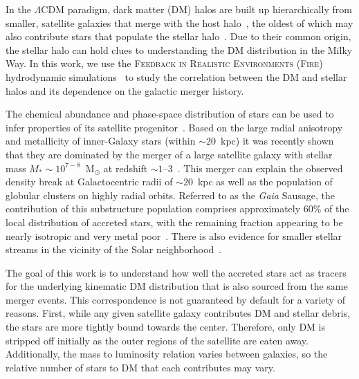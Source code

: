 \documentclass[twocolumn,preprintnumbers]{aastex6}
\begin{document}
In the $\Lambda$CDM paradigm, dark matter (DM) halos are built up hierarchically from smaller, satellite galaxies that merge with the host halo~\citep{1978MNRAS.183..341W,Diemand:2008in,Springel:2008cc,2011ApJ...740..102K}, the oldest of which may also contribute stars that populate the stellar halo~\citep{Johnston:1995vd, Johnston:1996sb, Helmi:1999ks, Bullock:2000qf, Bullock:2005pi, Purcell:2007tr, DeLucia:2008gk}. Due to their common origin, the stellar halo can hold clues to understanding the DM distribution in the Milky Way.  In this work, we use the \textsc{Feedback in Realistic Environments (Fire)} hydrodynamic simulations~\citep{2014MNRAS.445..581H, 2017arXiv170206148H} to study the correlation between the DM and stellar halos and its dependence on the galactic merger history.

The chemical abundance and phase-space distribution of stars can be used to infer properties of its satellite progenitor~\citep{Helmi:2002iu, 2005ApJ...635..931B, Robertson:2005gv, Font:2005qs, DeLucia:2008gk, 2016ApJ...821....5D}.  Based on the large radial anisotropy and metallicity of inner-Galaxy stars (within $\sim20$~kpc) it was recently shown that they are dominated by the merger of a large satellite galaxy with stellar mass $M_* \sim 10^{7-8}$~M$_\odot$ at redshift $\sim 1$--3~\citep{2018arXiv180203414B}.  This merger can explain the observed density break at Galactocentric radii of $\sim 20$~kpc as well as the population of globular clusters on highly radial orbits.  Referred to as the \emph{Gaia} Sausage, the contribution of this substructure population comprises approximately 60\% of the local distribution of accreted stars, with the remaining fraction appearing to be nearly isotropic and very metal poor~\citep{necib2018}.  There is also evidence for smaller stellar streams in the vicinity of the Solar neighborhood~\citep{Myeong:2017skt}.

The goal of this work is to understand how well the accreted stars act as tracers for the underlying kinematic DM distribution that is also sourced from the same merger events.  This correspondence is not guaranteed by default for a variety of reasons.  First, while any given satellite galaxy contributes DM and stellar debris, the stars are more tightly bound towards the center.  Therefore, only DM is stripped off initially as the outer regions of the satellite are eaten away.  Additionally, the mass to luminosity relation varies between galaxies, so the relative number of stars to DM that each contributes may vary.  
\end{document}
